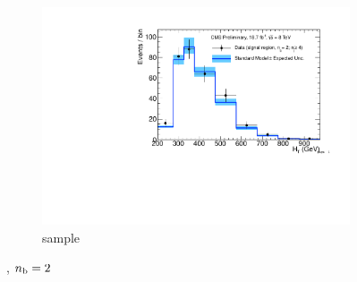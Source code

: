 \begin{figure}[h!]
\begin{subfigure}[b]{0.48\textwidth}
    \includegraphics[width=\textwidth,page=4]
    {Figs/results/v0/blueBand/bestFit_2012dev_RQcdZero_fZinvAll_2b_ge4j-1h_smOnly}
    \caption{\mj sample}
  \end{subfigure}
  \caption{\njhigh, $n_{\text{b}} = 2$}
  \label{fig:blue_fits_2b_ge4j}
\end{figure}



